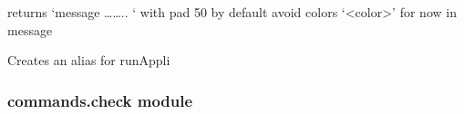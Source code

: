 \documentclass[a4paper,10pt,english]{sphinxmanual}
\begin{document}

\begin{fulllineitems}
\label{\detokenize{apidoc_commands/commands:commands.application.get_SALOME_modules}}
\end{fulllineitems}


\begin{fulllineitems}
\label{\detokenize{apidoc_commands/commands:commands.application.get_step}}
returns ‘message …….. ‘ with pad 50 by default
avoid colors ‘\textless{}color\textgreater{}’ for now in message

\end{fulllineitems}


\begin{fulllineitems}
\label{\detokenize{apidoc_commands/commands:commands.application.make_alias}}
Creates an alias for runAppli

\end{fulllineitems}



\subsubsection{commands.check module}
\label{\detokenize{apidoc_commands/commands:module-commands.check}}\label{\detokenize{apidoc_commands/commands:commands-check-module}}
\end{document}

